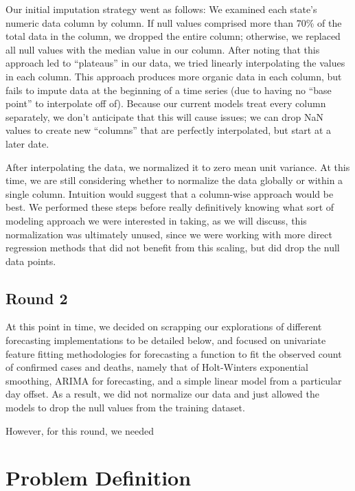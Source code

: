 \documentclass[sigconf,nonacm]{acmart}
\begin{document}
Our initial imputation strategy went as follows: We examined each state’s
numeric data column by column. If null values comprised more than 70\% of the
total data in the column, we dropped the entire column; otherwise, we replaced
all null values with the median value in our column. After noting that this
approach led to “plateaus” in our data, we tried linearly interpolating the
values in each column. This approach produces more organic data in each column,
but fails to impute data at the beginning of a time series (due to having no
“base point” to interpolate off of). Because our current models treat every
column separately, we don’t anticipate that this will cause issues; we can drop
NaN values to create new “columns” that are perfectly interpolated, but start
at a later date.  

After interpolating the data, we normalized it to zero mean unit variance. At
this time, we are still considering whether to normalize the data globally or
within a single column. Intuition would suggest that a column-wise approach
would be best. We performed these steps before really definitively knowing what
sort of modeling approach we were interested in taking, as we will discuss,
this normalization was ultimately unused, since we were working with more
direct regression methods that did not benefit from this scaling, but did drop
the null data points.

\subsection{Round 2}

At this point in time, we decided on scrapping our explorations of different
forecasting implementations to be detailed below, and focused on univariate
feature fitting methodologies for forecasting a function to fit the observed
count of confirmed cases and deaths, namely that of Holt-Winters exponential
smoothing, ARIMA for forecasting, and a simple linear model from a particular
day offset. As a result, we did not normalize our data and just allowed the
models to drop the null values from the training dataset.

However, for this round, we needed 


\section{Problem Definition}

\end{document}
